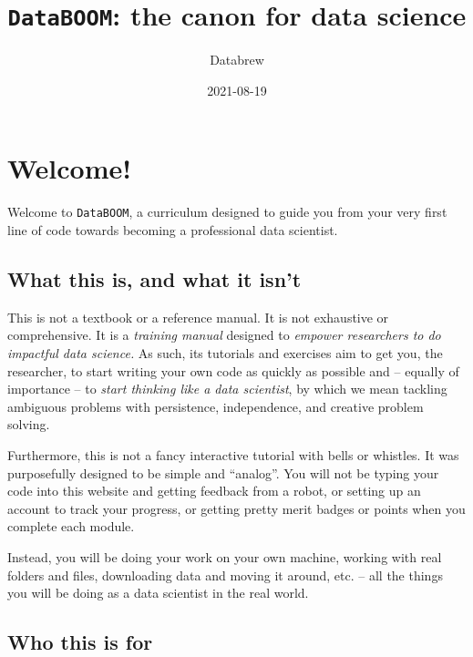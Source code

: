 \documentclass[
]{book}
\title{\texttt{DataBOOM}: the canon for data science}
\author{Databrew}
\date{2021-08-19}
\begin{document}
\maketitle

{
\setcounter{tocdepth}{1}
\tableofcontents
}
\hypertarget{welcome}{%
\chapter{Welcome!}\label{welcome}}

Welcome to \texttt{DataBOOM}, a curriculum designed to guide you from your very first line of code towards becoming a professional data scientist.

\hypertarget{what-this-is-and-what-it-isnt}{%
\section*{What this is, and what it isn't}\label{what-this-is-and-what-it-isnt}}

This is not a textbook or a reference manual. It is not exhaustive or comprehensive. It is a \emph{training manual} designed to \emph{empower researchers to do impactful data science.} As such, its tutorials and exercises aim to get you, the researcher, to start writing your own code as quickly as possible and -- equally of importance -- to \emph{start thinking like a data scientist}, by which we mean tackling ambiguous problems with persistence, independence, and creative problem solving.

Furthermore, this is not a fancy interactive tutorial with bells or whistles. It was purposefully designed to be simple and ``analog''. You will not be typing your code into this website and getting feedback from a robot, or setting up an account to track your progress, or getting pretty merit badges or points when you complete each module.

Instead, you will be doing your work on your own machine, working with real folders and files, downloading data and moving it around, etc. -- all the things you will be doing as a data scientist in the real world.

\hypertarget{who-this-is-for}{%
\section*{Who this is for}\label{who-this-is-for}}
\end{document}
